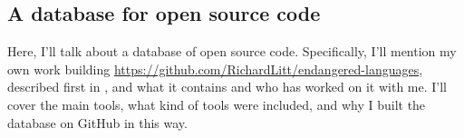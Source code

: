 %
%



\subsection{A database for open source code}
\label{sec:solutions}

Here, I'll talk about a database of open source code. Specifically, I'll mention my own work building \href{https://github.com/RichardLitt/endangered-languages}{https://github.com/RichardLitt/endangered-languages}, described first in \citet{CCURL}, and what it contains and who has worked on it with me. I'll cover the main tools, what kind of tools were included, and why I built the database on GitHub in this way.

